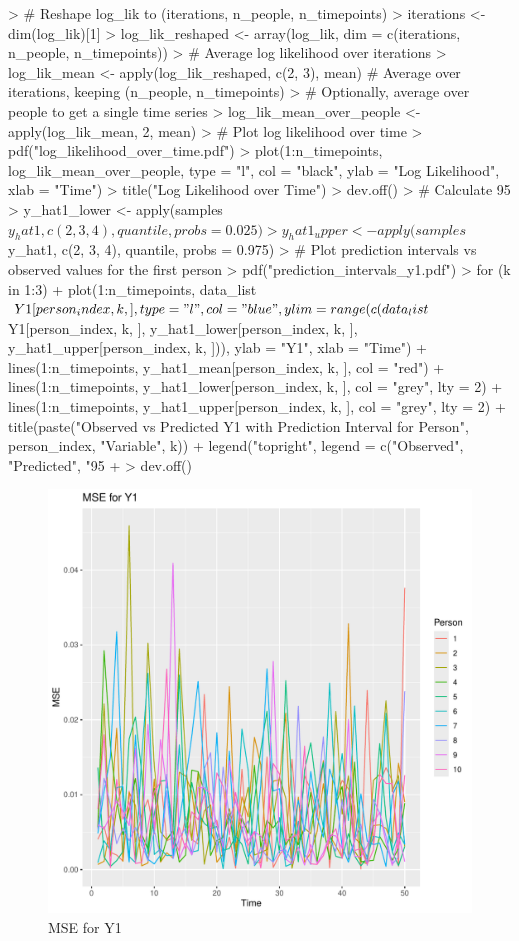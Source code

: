 \documentclass{article}
\begin{document}
\begin{Schunk}
\begin{Sinput}
> # Reshape log_lik to (iterations, n_people, n_timepoints)
> iterations <- dim(log_lik)[1]
> log_lik_reshaped <- array(log_lik, dim = c(iterations, n_people, n_timepoints))
> # Average log likelihood over iterations
> log_lik_mean <- apply(log_lik_reshaped, c(2, 3), mean)  # Average over iterations, keeping (n_people, n_timepoints)
> # Optionally, average over people to get a single time series
> log_lik_mean_over_people <- apply(log_lik_mean, 2, mean)
> # Plot log likelihood over time
> pdf("log_likelihood_over_time.pdf")
> plot(1:n_timepoints, log_lik_mean_over_people, type = "l", col = "black", ylab = "Log Likelihood", xlab = "Time")
> title("Log Likelihood over Time")
> dev.off()
> # Calculate 95%
> y_hat1_lower <- apply(samples$y_hat1, c(2, 3, 4), quantile, probs = 0.025)
> y_hat1_upper <- apply(samples$y_hat1, c(2, 3, 4), quantile, probs = 0.975)
> # Plot prediction intervals vs observed values for the first person
> pdf("prediction_intervals_y1.pdf")
> for (k in 1:3) {
+   plot(1:n_timepoints, data_list$Y1[person_index, k, ], type = "l", col = "blue", ylim = range(c(data_list$Y1[person_index, k, ], y_hat1_lower[person_index, k, ], y_hat1_upper[person_index, k, ])), ylab = "Y1", xlab = "Time")
+   lines(1:n_timepoints, y_hat1_mean[person_index, k, ], col = "red")
+   lines(1:n_timepoints, y_hat1_lower[person_index, k, ], col = "grey", lty = 2)
+   lines(1:n_timepoints, y_hat1_upper[person_index, k, ], col = "grey", lty = 2)
+   title(paste("Observed vs Predicted Y1 with Prediction Interval for Person", person_index, "Variable", k))
+   legend("topright", legend = c("Observed", "Predicted", "95%
+ }
> dev.off()
\end{Sinput}
\end{Schunk}

\begin{figure}[h]
  \centering
  \includegraphics[width=\textwidth]{mse_plot_y1.pdf}
  \caption{MSE for Y1}
\end{figure}
\end{document}
